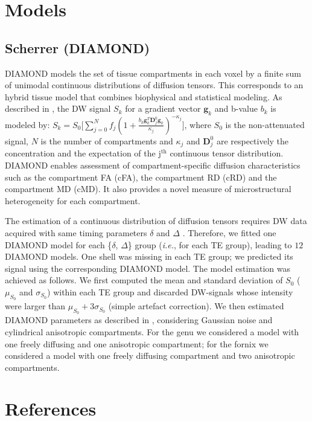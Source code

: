 \documentclass[3p]{elsarticle}
\begin{document}
\section{Models}

\subsection{Scherrer (DIAMOND)} 
DIAMOND models the set of tissue compartments in each voxel by a finite sum of unimodal continuous distributions of diffusion tensors. This corresponds to an hybrid tissue model that combines biophysical and statistical modeling. 
As described in \citep{scherrer_mrm2015}, the DW  signal $S_k$ for a gradient vector $\mathbf{g}_k$ and b-value $b_k$ is modeled by: 
$S_k = S_0 \big[  \sum_{j=0}^{N} f_j  {\left( 1+ \frac{b_k \mathbf{g}_k^T  \mathbf{D}^0_j  \mathbf{g}_k }{\kappa_j}  \right)}^{-\kappa_j} \big]$,
where $S_0$ is the non-attenuated signal, $N$ is the number of compartments and $\kappa_j$ and $ \mathbf{D}^0_j$ are respectively the concentration and the expectation of the j$^\mathrm{th}$ continuous tensor distribution.
DIAMOND enables  assessment of compartment-specific diffusion characteristics such as the compartment FA (cFA), the compartment RD (cRD) and the compartment MD (cMD). It also provides a novel measure of microstructural heterogeneity for each compartment.

The estimation of a continuous distribution of diffusion tensors requires DW data acquired with same timing parameters $\delta$ and $\Delta$ \citep{scherrer_mrm2015}. Therefore, we fitted one DIAMOND model for each \{$\delta$, $\Delta$\} group  (\textit{i.e.}, for each TE group), leading to $12$ DIAMOND models. One shell was missing in each TE group; we predicted its signal using the corresponding DIAMOND model. The model estimation was achieved as follows. We first computed the mean  and standard deviation  of $S_0$ ($\mu_{S_0}$ and $\sigma_{S_0}$) within each TE group and discarded DW-signals whose intensity were larger than $\mu_{S_0} + 3\sigma_{S_0}$ (simple artefact correction). We then estimated DIAMOND parameters as described in \citet{scherrer_mrm2015}, considering Gaussian noise and cylindrical anisotropic compartments. 
For the genu we considered a model with one freely diffusing and one anisotropic compartment; for the fornix we considered a model with  one freely diffusing compartment and two anisotropic compartments.


\section*{References}

\end{document}
